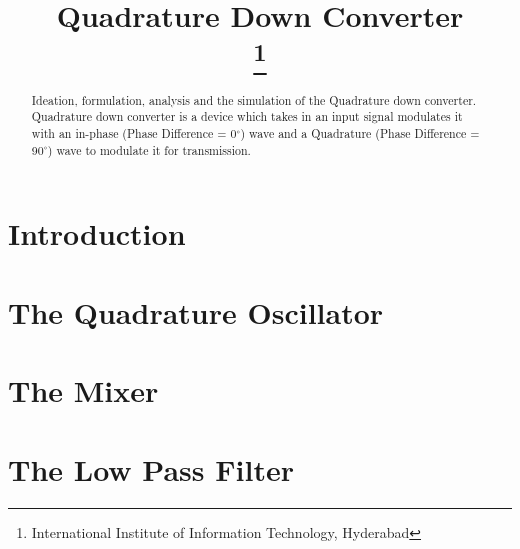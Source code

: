 \documentclass[conference]{IEEEtran}
\begin{document}
\title{Quadrature Down Converter\\
\thanks{International Institute of Information Technology, Hyderabad}
}

\author{
\and
{}
\and
{}
}
\maketitle

\begin{abstract}
Ideation, formulation, analysis and the simulation of the Quadrature down converter.
Quadrature down converter is a device which takes in an input signal modulates it with an in-phase (Phase Difference = 0$^\circ$) wave and a Quadrature (Phase Difference = 90$^\circ$) wave to modulate it for transmission. 
\end{abstract}

\section{Introduction}
\label{sec:intro}


\section{The Quadrature Oscillator}
\label{sec:quadrature_osci}


\section{The Mixer}
\label{sec:mixer}


\section{The Low Pass Filter}
\label{sec:low_pass_filter}

\end{document}
